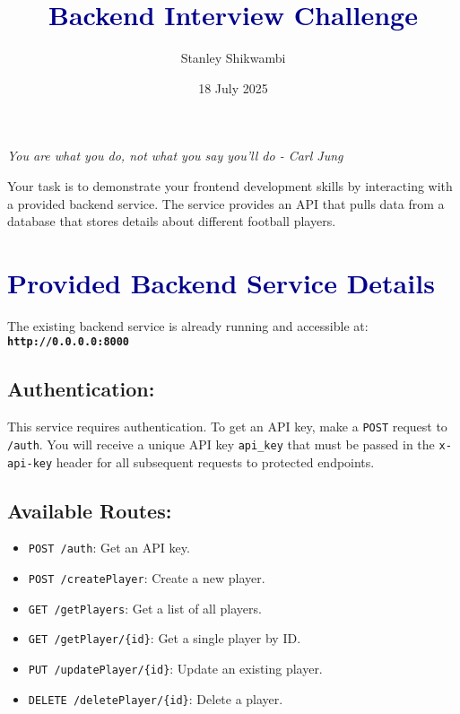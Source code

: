 \documentclass[10pt, a4paper]{article}
\title{\textcolor{darkblue}{\textbf{Backend Interview Challenge}}}
\author{Stanley Shikwambi} %
\date{18 July 2025} %
\begin{document}
\maketitle
\thispagestyle{empty} %

\begin{center}
    \textit{You are what you do, not what you say you'll do - Carl Jung}
\end{center}

\vspace{1cm}

Your task is to demonstrate your frontend development skills by interacting with a provided backend service. The service provides an API that pulls data from a database that stores details about different football players.

\section*{\textcolor{darkblue}{Provided Backend Service Details}}
The existing backend service is already running and accessible at:
\textbf{\texttt{http://0.0.0.0:8000}}

\subsection*{Authentication:}
This service requires authentication. To get an API key, make a \texttt{POST} request to \texttt{/auth}. You will receive a unique API key \texttt{api\_key} that must be passed in the \texttt{x-api-key} header for all subsequent requests to protected endpoints.

\subsection*{Available Routes:}
\begin{itemize}[label=\textbullet, leftmargin=*, itemsep=0.5em]
    \item \texttt{POST /auth}: Get an API key.
    \item \texttt{POST /createPlayer}: Create a new player.
    \item \texttt{GET /getPlayers}: Get a list of all players.
    \item \texttt{GET /getPlayer/\{id\}}: Get a single player by ID.
    \item \texttt{PUT /updatePlayer/\{id\}}: Update an existing player.
    \item \texttt{DELETE /deletePlayer/\{id\}}: Delete a player.
\end{itemize}
\end{document}
